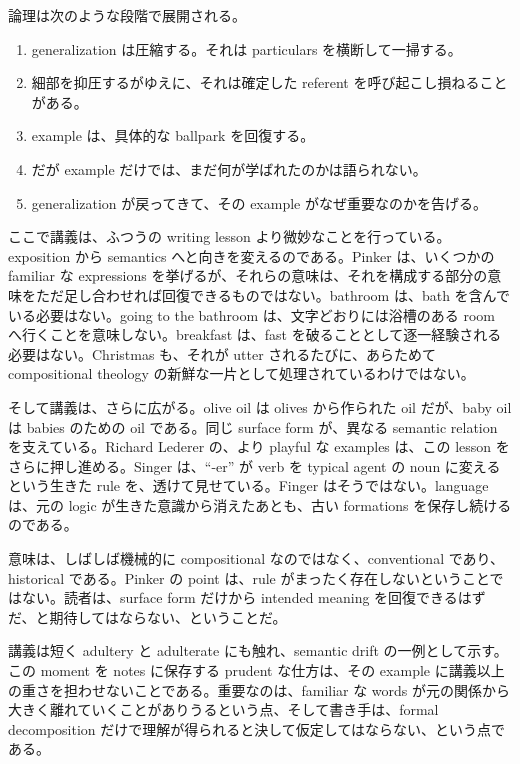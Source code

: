 論理は次のような段階で展開される。
\begin{enumerate}
\item generalization は圧縮する。それは particulars を横断して一掃する。
\item 細部を抑圧するがゆえに、それは確定した referent を呼び起こし損ねることがある。
\item example は、具体的な ballpark を回復する。
\item だが example だけでは、まだ何が学ばれたのかは語られない。
\item generalization が戻ってきて、その example がなぜ重要なのかを告げる。
\end{enumerate}

ここで講義は、ふつうの writing lesson より微妙なことを行っている。exposition から semantics へと向きを変えるのである。Pinker は、いくつかの familiar な expressions を挙げるが、それらの意味は、それを構成する部分の意味をただ足し合わせれば回復できるものではない。bathroom は、bath を含んでいる必要はない。going to the bathroom は、文字どおりには浴槽のある room へ行くことを意味しない。breakfast は、fast を破ることとして逐一経験される必要はない。Christmas も、それが utter されるたびに、あらためて compositional theology の新鮮な一片として処理されているわけではない。

そして講義は、さらに広がる。olive oil は olives から作られた oil だが、baby oil は babies のための oil である。同じ surface form が、異なる semantic relation を支えている。Richard Lederer の、より playful な examples は、この lesson をさらに押し進める。Singer は、``-er'' が verb を typical agent の noun に変えるという生きた rule を、透けて見せている。Finger はそうではない。language は、元の logic が生きた意識から消えたあとも、古い formations を保存し続けるのである。

\begin{remark}
意味は、しばしば機械的に compositional なのではなく、conventional であり、historical である。Pinker の point は、rule がまったく存在しないということではない。読者は、surface form だけから intended meaning を回復できるはずだ、と期待してはならない、ということだ。
\end{remark}

講義は短く adultery と adulterate にも触れ、semantic drift の一例として示す。この moment を notes に保存する prudent な仕方は、その example に講義以上の重さを担わせないことである。重要なのは、familiar な words が元の関係から大きく離れていくことがありうるという点、そして書き手は、formal decomposition だけで理解が得られると決して仮定してはならない、という点である。


